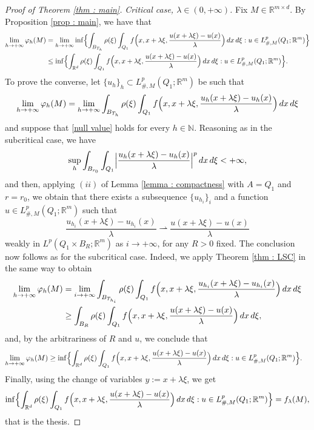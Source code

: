 \documentclass{article}
\theoremstyle{definition}
\newcommand{\f}{\varphi}
\newcommand{\N}{\mathbb{N}}
\newcommand{\R}{\mathbb{R}}
\begin{document}
\begin{proof}[Proof of Theorem \ref{thm : main}]
{\em Critical case, $\lambda\in(0,+\infty)$.} Fix $M\in \R^{m\times d}$. By Proposition \ref{prop : main}, we have that
    \begin{align*}
      \lim_{h\to+\infty} \f_h(M) & =  \lim_{h\to+\infty} \inf\Bigl\{ \int_{B_{T_h}} \rho(\xi)\int_{Q_1} f\Bigl(x,x+\lambda\xi,\frac{u(x+\lambda\xi)-u(x)}{\lambda}\Bigr)\, dx\, d\xi : u\in L^p_{\#,M}(Q_1;\R^m) \Bigr\} \\
        & \leq \inf\Bigl\{ \int_{\R^d} \rho(\xi)\int_{Q_1} f\Bigl(x,x+\lambda\xi,\frac{u(x+\lambda\xi)-u(x)}{\lambda}\Bigr)\, dx\, d\xi : u\in L^p_{\#,M}(Q_1;\R^m) \Bigr\}.
    \end{align*}
To prove the converse, let $\{u_h\}_h\subset L^p_{\#,M}(Q_1;\R^m)$ be such that
\begin{equation*}
    \lim_{h\to+\infty} \f_h(M) =\lim_{h\to+\infty} \int_{B_{T_h}} \rho(\xi)\int_{Q_1} f\Bigl(x,x+\lambda\xi,\frac{u_h(x+\lambda\xi)-u_h(x)}{\lambda}\Bigr)\, dx\, d\xi 
\end{equation*}
and suppose that \eqref{null value} holds for every $h\in \N$. Reasoning as in the subcritical case, we have
\begin{equation*}
     \sup_h \int_{B_{r_0}} \int_{Q_1} \Bigl|\frac{u_h(x+\lambda\xi)-u_h(x)}{\lambda}\Bigr|^p\, dx\,d\xi  <+\infty,
\end{equation*}
and then, applying $(ii)$ of Lemma \ref{lemma : compactness} with $A=Q_1$ and $r=r_0$, we obtain 
that there exists a subsequence $\{u_{h_i}\}_i$ and a function $u\in L^p_{\#,M}(Q_1;\R^m)$ such that
\begin{equation*}
     \frac{u_{h_i}(x+\lambda\xi)-u_{h_i}(x)}{\lambda}\rightharpoonup \frac{u(x+\lambda\xi)-u(x)}{\lambda} 
\end{equation*}
weakly in $L^p(Q_1\times B_R;\R^m)$ as $i\to+\infty$, for any $R>0$ fixed. The conclusion now follows as for the subcritical case. Indeed, we apply Theorem \ref{thm : LSC} in the same way to obtain 
\begin{align*}
       \lim_{h\to+\infty} \f_h(M) & = \lim_{i\to+\infty} \int_{B_{T_{h_i}}} \rho(\xi)\int_{Q_1} f\Bigl(x,x+\lambda\xi,\frac{u_{h_i}(x+\lambda\xi)-u_{h_i}(x)}{\lambda}\Bigr)\, dx\, d\xi \\
      & \geq \int_{B_R} \rho(\xi)\int_{Q_1} f\Bigl(x,x+\lambda\xi,\frac{u(x+\lambda\xi)-u(x)}{\lambda}\Bigr)\, dx\, d\xi, 
      \end{align*}
and, by the arbitrariness of $R$ and $u$, we conclude that
\begin{align*}
     \lim_{h\to+\infty} \f_h(M) & \geq\inf\Bigl\{ \int_{\R^d} \rho(\xi)\int_{Q_1} f\Bigl(x,x+\lambda\xi,\frac{u(x+\lambda\xi)-u(x)}{\lambda}\Bigr)\, dx\, d\xi : u\in L^p_{\#,M}(Q_1;\R^m) \Bigr\}.
\end{align*}
Finally, using the change of variables $y:=x+\lambda\xi$, we get
\begin{equation*}
  \inf\Bigl\{ \int_{\R^d} \rho(\xi)\int_{Q_1} f\Bigl(x,x+\lambda\xi,\frac{u(x+\lambda\xi)-u(x)}{\lambda}\Bigr)\, dx\, d\xi : u\in L^p_{\#,M}(Q_1;\R^m) \Bigr\}=f_\lambda(M),
\end{equation*}
that is the thesis.


\end{proof}
\end{document}

